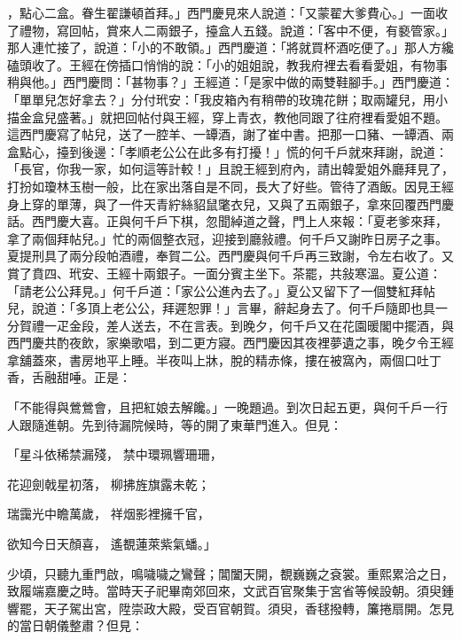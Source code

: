 ，點心二盒。眷生翟謙頓首拜。」西門慶見來人說道：「又蒙翟大爹費心。」一面收了禮物，寫回帖，賞來人二兩銀子，擡盒人五錢。說道：「客中不便，有褻管家。」那人連忙接了，說道：「小的不敢領。」西門慶道：「將就買杯酒吃便了。」那人方纔磕頭收了。王經在傍插口悄悄的說：「小的姐姐說，教我府裡去看看愛姐，有物事稍與他。」西門慶問：「甚物事？」王經道：「是家中做的兩雙鞋腳手。」西門慶道：「單單兒怎好拿去？」分付玳安：「我皮箱內有稍帶的玫瑰花餅；取兩罐兒，用小描金盒兒盛著。」就把回帖付與王經，穿上青衣，教他同跟了往府裡看愛姐不題。這西門慶寫了帖兒，送了一腔羊、一罈酒，謝了崔中書。把那一口豬、一罈酒、兩盒點心，擡到後邊：「孝順老公公在此多有打擾！」慌的何千戶就來拜謝，說道：「長官，你我一家，如何這等計較！」且說王經到府內，請出韓愛姐外廳拜見了，打扮如瓊林玉樹一般，比在家出落自是不同，長大了好些。管待了酒飯。因見王經身上穿的單薄，與了一件天青紵絲貂鼠氅衣兒，又與了五兩銀子，拿來回覆西門慶話。西門慶大喜。正與何千戶下棋，忽聞綽道之聲，門上人來報：「夏老爹來拜，拿了兩個拜帖兒。」忙的兩個整衣冠，迎接到廳敍禮。何千戶又謝昨日房子之事。夏提刑具了兩分段帕酒禮，奉賀二公。西門慶與何千戶再三致謝，令左右收了。又賞了賁四、玳安、王經十兩銀子。一面分賓主坐下。茶罷，共敍寒溫。夏公道：「請老公公拜見。」何千戶道：「家公公進內去了。」夏公又留下了一個雙紅拜帖兒，說道：「多頂上老公公，拜遲恕罪！」言畢，辭起身去了。何千戶隨即也具一分賀禮一疋金段，差人送去，不在言表。到晚夕，何千戶又在花園暖閣中擺酒，與西門慶共酌夜飲，家樂歌唱，到二更方寢。西門慶因其夜裡夢遺之事，晚夕令王經拿舖蓋來，書房地平上睡。半夜叫上牀，脫的精赤條，摟在被窩內，兩個口吐丁香，舌融甜唾。正是：

「不能得與鶯鶯會，且把紅娘去解饞。」一晚題過。到次日起五更，與何千戶一行人跟隨進朝。先到待漏院候時，等的開了東華門進入。但見：

「星斗依稀禁漏殘，  禁中環珮響珊珊，

花迎劍戟星初落，  柳拂旌旗露未乾；

瑞靄光中瞻萬歲，  祥烟影裡擁千官，

欲知今日天顏喜，  遙覩蓮萊紫氣蟠。」

少頃，只聽九重門啟，鳴噦噦之鸞聲；閶闔天開，覩巍巍之袞裳。重熙累洽之日，致履端嘉慶之時。當時天子祀畢南郊回來，文武百官聚集于宮省等候設朝。須臾鍾響罷，天子駕出宮，陞崇政大殿，受百官朝賀。須臾，香毬撥轉，簾捲扇開。怎見的當日朝儀整肅？但見：

